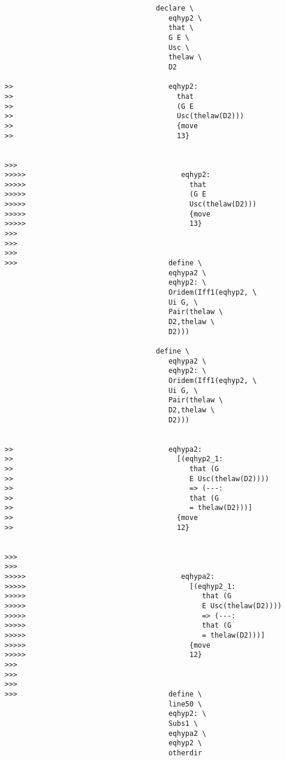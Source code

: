 \documentclass[12pt]{article}
\begin{document}
\begin{verbatim}
                                    declare \
                                       eqhyp2 \
                                       that \
                                       G E \
                                       Usc \
                                       thelaw \
                                       D2

>>                                     eqhyp2:
>>                                       that
>>                                       (G E
>>                                       Usc(thelaw(D2)))
>>                                       {move
>>                                       13}


>>>
>>>>>                                     eqhyp2:
>>>>>                                       that
>>>>>                                       (G E
>>>>>                                       Usc(thelaw(D2)))
>>>>>                                       {move
>>>>>                                       13}
>>>
>>>
>>>
>>>                                    define \
                                       eqhypa2 \
                                       eqhyp2: \
                                       Oridem(Iff1(eqhyp2, \
                                       Ui G, \
                                       Pair(thelaw \
                                       D2,thelaw \
                                       D2)))

                                    define \
                                       eqhypa2 \
                                       eqhyp2: \
                                       Oridem(Iff1(eqhyp2, \
                                       Ui G, \
                                       Pair(thelaw \
                                       D2,thelaw \
                                       D2)))


>>                                     eqhypa2:
>>                                       [(eqhyp2_1:
>>                                          that (G
>>                                          E Usc(thelaw(D2))))
>>                                          => (---:
>>                                          that (G
>>                                          = thelaw(D2)))]
>>                                       {move
>>                                       12}


>>>
>>>
>>>>>                                     eqhypa2:
>>>>>                                       [(eqhyp2_1:
>>>>>                                          that (G
>>>>>                                          E Usc(thelaw(D2))))
>>>>>                                          => (---:
>>>>>                                          that (G
>>>>>                                          = thelaw(D2)))]
>>>>>                                       {move
>>>>>                                       12}
>>>
>>>
>>>
>>>                                    define \
                                       line50 \
                                       eqhyp2: \
                                       Subs1 \
                                       eqhypa2 \
                                       eqhyp2 \
                                       otherdir


\end{verbatim}
\end{document}
